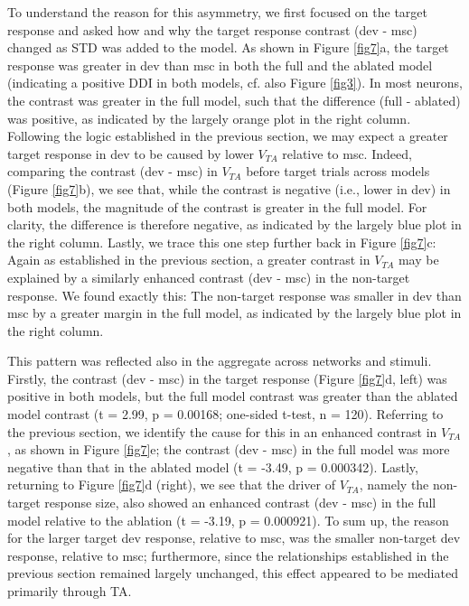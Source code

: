 \documentclass[pdflatex,referee,iicol,sn-basic]{sn-jnl}
\theoremstyle{thmstyleone}%
\theoremstyle{thmstyletwo}%
\theoremstyle{thmstylethree}%
\begin{document}
To understand the reason for this asymmetry, we first focused on the target response and asked how and why the target response contrast (dev - msc) changed as STD was added to the model. As shown in Figure \ref{fig7}a, the target response was greater in dev than msc in both the full and the ablated model (indicating a positive DDI in both models, cf. also Figure \ref{fig3}). In most neurons, the contrast was greater in the full model, such that the difference (full - ablated) was positive, as indicated by the largely orange plot in the right column.
Following the logic established in the previous section, we may expect a greater target response in dev to be caused by lower $V_{TA}$ relative to msc. Indeed, comparing the contrast (dev - msc) in $V_{TA}$ before target trials across models (Figure \ref{fig7}b), we see that, while the contrast is negative (i.e., lower in dev) in both models, the magnitude of the contrast is greater in the full model. For clarity, the difference is therefore negative, as indicated by the largely blue plot in the right column.
Lastly, we trace this one step further back in Figure \ref{fig7}c: Again as established in the previous section, a greater contrast in $V_{TA}$ may be explained by a similarly enhanced contrast (dev - msc) in the non-target response. We found exactly this: The non-target response was smaller in dev than msc by a greater margin in the full model, as indicated by the largely blue plot in the right column.

This pattern was reflected also in the aggregate across networks and stimuli. Firstly, the contrast (dev - msc) in the target response (Figure \ref{fig7}d, left) was positive in both models, but the full model contrast was greater than the ablated model contrast (t = 2.99, p = 0.00168; one-sided t-test, n = 120). Referring to the previous section, we identify the cause for this in an enhanced contrast in $V_{TA}$, as shown in Figure \ref{fig7}e; the contrast (dev - msc) in the full model was more negative than that in the ablated model (t = -3.49, p = 0.000342). Lastly, returning to Figure \ref{fig7}d (right), we see that the driver of $V_{TA}$, namely the non-target response size, also showed an enhanced contrast (dev - msc) in the full model relative to the ablation (t = -3.19, p = 0.000921). To sum up, the reason for the larger target dev response, relative to msc, was the smaller non-target dev response, relative to msc; furthermore, since the relationships established in the previous section remained largely unchanged, this effect appeared to be mediated primarily through TA.
\end{document}

